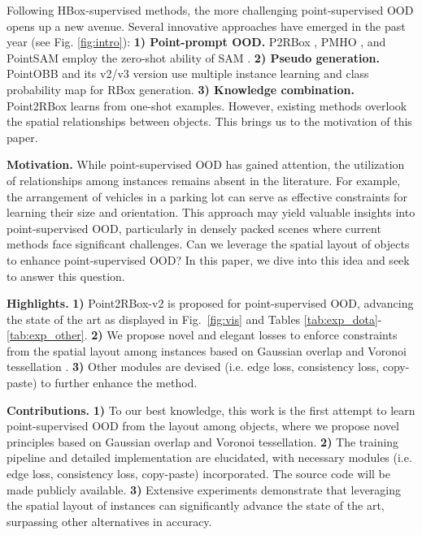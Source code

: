 Following HBox-supervised methods, the more challenging point-supervised OOD opens up a new avenue. Several innovative approaches have emerged in the past year (see Fig. \ref{fig:intro}):
\textbf{1) Point-prompt OOD.} P2RBox \citep{cao2023p2rbox}, PMHO \citep{zhang2024pmho}, and PointSAM \citep{liu2024pointsam} employ the zero-shot ability of SAM \citep{kirillov2023segment}.
\textbf{2) Pseudo generation.} PointOBB \cite{luo2024pointobb} and its v2/v3 version \cite{ren2024pointobbv2, zhang2025pointobbv3} use multiple instance learning and class probability map for RBox generation. 
\textbf{3) Knowledge combination.} Point2RBox \cite{yu2024point2rbox} learns from one-shot examples.
However, existing methods overlook the spatial relationships between objects. This brings us to the motivation of this paper.

\textbf{Motivation.} While point-supervised OOD has gained attention, the utilization of relationships among instances remains absent in the literature. For example, the arrangement of vehicles in a parking lot can serve as effective constraints for learning their size and orientation. This approach may yield valuable insights into point-supervised OOD, particularly in densely packed scenes where current methods face significant challenges. Can we leverage the spatial layout of objects to enhance point-supervised OOD? In this paper, we dive into this idea and seek to answer this question.

\textbf{Highlights.} \textbf{1)} Point2RBox-v2 is proposed for point-supervised OOD, advancing the state of the art as displayed in Fig.~\ref{fig:vis} and Tables \ref{tab:exp_dota}-\ref{tab:exp_other}. 
\textbf{2)} We propose novel and elegant losses to enforce constraints from the spatial layout among instances based on Gaussian overlap and Voronoi tessellation \cite{aurenhammer1991voronoi}. 
\textbf{3)} Other modules are devised (i.e. edge loss, consistency loss, copy-paste) to further enhance the method.

\textbf{Contributions.} \textbf{1)} To our best knowledge, this work is the first attempt to learn point-supervised OOD from the layout among objects, where we propose novel principles based on Gaussian overlap and Voronoi tessellation.
\textbf{2)} The training pipeline and detailed implementation are elucidated, with necessary modules (i.e. edge loss, consistency loss, copy-paste) incorporated. The source code will be made publicly available.
\textbf{3)} Extensive experiments demonstrate that leveraging the spatial layout of instances can significantly advance the state of the art, surpassing other alternatives in accuracy.
